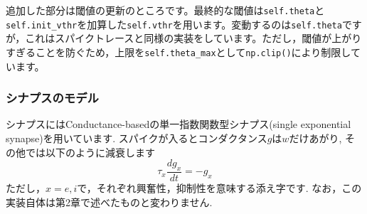 追加した部分は閾値の更新のところです。最終的な閾値は\texttt{self.theta}と\texttt{self.init\_vthr}を加算した\texttt{self.vthr}を用います。変動するのは\texttt{self.theta}ですが，これはスパイクトレースと同様の実装をしています。ただし，閾値が上がりすぎることを防ぐため，上限を\texttt{self.theta\_max}として\texttt{np.clip()}により制限しています。

\subsubsection{シナプスのモデル}
シナプスにはConductance-basedの単一指数関数型シナプス(single exponential synapse)を用いています. スパイクが入るとコンダクタンス$g$は$w$だけあがり, その他では以下のように減衰します
\begin{equation}
\tau_{x} \frac{dg_x}{d t}=-g_x    
\end{equation}
ただし，$x=e, i$で，それぞれ興奮性，抑制性を意味する添え字です. なお，この実装自体は第2章で述べたものと変わりません. 


